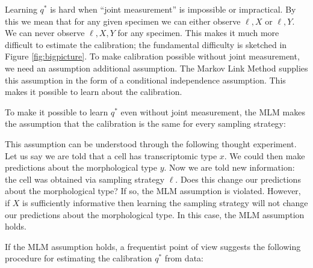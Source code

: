 Learning $q^*$ is hard when ``joint measurement'' is impossible or impractical.  By this we mean that for any given specimen we can either observe $\ell, X$ or $\ell,Y$.  We can never observe $\ell,X,Y$ for any specimen.  This makes it much more difficult to estimate the calibration; the fundamental difficulty is sketched in Figure \ref{fig:bigpicture}.  To make calibration possible without joint measurement, we need an assumption additional assumption.  The Markov Link Method supplies this assumption in the form of a conditional independence assumption.  This makes it possible to learn about the calibration.

To make it possible to learn $q^*$ even without joint measurement, the MLM makes the assumption that the calibration is the same for every sampling strategy:

\begin{center}
\end{center}

This assumption can be understood through the following thought experiment.  Let us say we are told that a cell has transcriptomic type $x$.  We could then make predictions about the morphological type $y$.  Now we are told new information: the cell was obtained via sampling strategy $\ell$.  Does this change our predictions about the morphological type?  If so, the MLM assumption is violated.  However, if $X$ is sufficiently informative then learning the sampling strategy will not change our predictions about the morphological type.  In this case, the MLM assumption holds.  

If the MLM assumption holds, a frequentist point of view suggests the following procedure for estimating the calibration $q^*$ from data:

